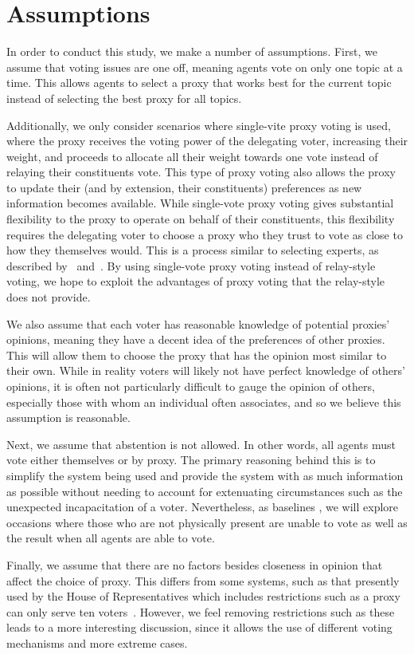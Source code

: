 \section{Assumptions}\label{sec:assumptions}
In order to conduct this study, we make a number of assumptions.
First, we assume that voting issues are one off, meaning agents vote on only one
topic at a time.
This allows agents to select a proxy that works best for the current topic instead of
selecting the best proxy for all topics.

Additionally, we only consider scenarios where single-vite proxy voting is used, where
the proxy receives the voting power of the delegating voter, increasing their weight,
and proceeds to allocate all their weight towards one vote instead of relaying their
constituents vote.
This type of proxy voting also allows the proxy to update their (and by extension, their
constituents) preferences as new information becomes available.
While single-vote proxy voting gives substantial flexibility to the proxy to operate
on behalf of their constituents, this flexibility requires the delegating voter to
choose a proxy who they trust to vote as close to how they themselves would.
This is a process similar to selecting experts, as described by~\cite{Miller1969}
and~\cite{Mueller1972}.
By using single-vote proxy voting instead of relay-style voting, we hope to exploit
the advantages of proxy voting that the relay-style does not provide.

We also assume that each voter has reasonable knowledge of potential proxies'
opinions, meaning they have a decent idea of the preferences of other proxies.
This will allow them to choose the proxy that has the opinion most similar to their own.
While in reality voters will likely not have perfect knowledge of others' opinions,
it is often not particularly difficult to gauge the opinion of others, especially
those with whom an individual often associates, and so we believe this assumption is
reasonable.

Next, we assume that abstention is not allowed.
In other words, all agents must vote either themselves or by proxy.
The primary reasoning behind this is to simplify the system being used and provide
the system with as much information as possible without needing to account for
extenuating circumstances such as the unexpected incapacitation of a voter.
Nevertheless, as baselines , we will explore occasions where those who are not
physically present are unable to vote as well as the result when all agents are able
to vote.

Finally, we assume that there are no factors besides closeness in opinion that affect
the choice of proxy.
This differs from some systems, such as that presently used by the House of
Representatives which includes restrictions such as a proxy can only serve ten
voters~\cite{CERP2020}.
However, we feel removing restrictions such as these leads to a more interesting
discussion, since it allows the use of different voting mechanisms and more extreme
cases.
